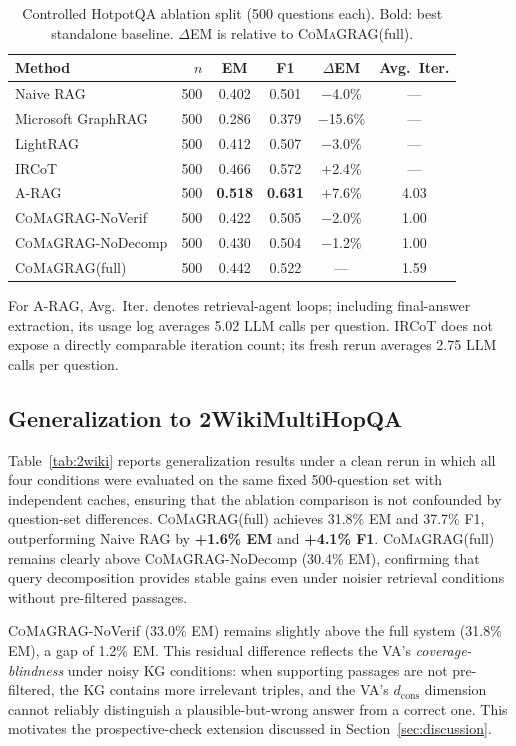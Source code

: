 \documentclass[runningheads]{llncs}
\newcommand{\sys}{\textsc{CoMaGRAG}\xspace}
\begin{document}
\begin{table}[t]
\centering
\caption{Controlled HotpotQA ablation split (500 questions each). Bold:
best standalone baseline. $\Delta$EM is relative to \sys (full).}
\label{tab:hotpot}
\small
\begin{tabular}{lrcccc}
\toprule
Method & $n$ & EM & F1 & $\Delta$EM & Avg.\ Iter. \\
\midrule
Naive RAG
  & 500 & 0.402 & 0.501 & $-$4.0\% & --- \\
Microsoft GraphRAG~\cite{edge2024graphrag}
  & 500 & 0.286 & 0.379 & $-$15.6\% & --- \\
LightRAG~\cite{guo2024lightrag}
  & 500 & 0.412 & 0.507 & $-$3.0\% & --- \\
IRCoT~\cite{trivedi2022ircot}
  & 500 & 0.466 & 0.572 & $+$2.4\% & --- \\
A-RAG~\cite{arag2026}
  & 500 & \textbf{0.518} & \textbf{0.631} & $+$7.6\% & 4.03 \\
\midrule
\sys-NoVerif
  & 500 & 0.422 & 0.505 & $-$2.0\%  & 1.00 \\
\sys-NoDecomp
  & 500 & 0.430 & 0.504 & $-$1.2\%  & 1.00 \\
\sys (full)
  & 500 & 0.442 & 0.522 & --- & 1.59 \\
\bottomrule
\end{tabular}
\end{table}

For A-RAG, Avg.\ Iter. denotes retrieval-agent loops; including final-answer
extraction, its usage log averages 5.02 LLM calls per question. IRCoT does not
expose a directly comparable iteration count; its fresh rerun averages
2.75 LLM calls per question.

\subsection{Generalization to 2WikiMultiHopQA}

Table~\ref{tab:2wiki} reports generalization results under a clean rerun in
which all four conditions were evaluated on the same fixed 500-question set
with independent caches, ensuring that the ablation comparison is not
confounded by question-set differences. \sys (full) achieves 31.8\% EM and
37.7\% F1, outperforming Naive RAG by \textbf{+1.6\% EM} and \textbf{+4.1\%
F1}. \sys (full) remains clearly above \sys-NoDecomp (30.4\% EM), confirming
that query decomposition provides stable gains even under noisier retrieval
conditions without pre-filtered passages.

\sys-NoVerif (33.0\% EM) remains slightly above the full system (31.8\% EM),
a gap of 1.2\% EM. This residual difference reflects the VA's
\emph{coverage-blindness} under noisy KG conditions: when supporting passages
are not pre-filtered, the KG contains more irrelevant triples, and the VA's
$d_\text{cons}$ dimension cannot reliably distinguish a plausible-but-wrong
answer from a correct one. This motivates the prospective-check extension
discussed in Section~\ref{sec:discussion}.
\end{document}
